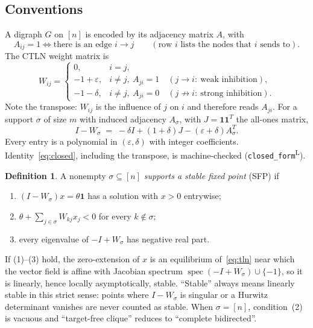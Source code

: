 \documentclass[11pt]{article}
\theoremstyle{definition}
\newtheorem{definition}[theorem]{Definition}
\newcommand{\one}{\mathbf{1}}
\newcommand{\eps}{\varepsilon}
\newcommand{\spec}{\operatorname{spec}}
\newcommand{\lean}{\textsuperscript{\textsf{L}}}
\begin{document}
\subsection{Conventions}
A digraph $G$ on $[n]$ is encoded by its adjacency matrix $A$, with
\[
A_{ij}=1\iff\text{there is an edge } i\to j\qquad(\text{row } i \text{ lists the nodes that } i \text{ sends to}).
\]
The CTLN weight matrix is
\begin{equation}\label{eq:W}
W_{ij}=\begin{cases}0,& i=j,\\ -1+\eps,& i\neq j,\ A_{ji}=1\quad(j\to i:\ \text{weak inhibition}),\\
-1-\delta,& i\neq j,\ A_{ji}=0\quad(j\not\to i:\ \text{strong inhibition}).\end{cases}
\end{equation}
Note the transpose: $W_{ij}$ is the influence of $j$ on $i$ and therefore reads $A_{ji}$. For a support
$\sigma$ of size $m$ with induced adjacency $A_\sigma$, with $J=\one\one^{T}$ the all-ones matrix,
\begin{equation}\label{eq:closed}
I-W_\sigma\;=\;-\delta I+(1+\delta)J-(\eps+\delta)A_\sigma^{T}.
\end{equation}
Every entry is a polynomial in $(\eps,\delta)$ with integer coefficients. Identity~\eqref{eq:closed},
including the transpose, is machine-checked (\texttt{closed\_form}\lean).

\begin{definition}\label{def:sfp}
A nonempty $\sigma\subseteq[n]$ \emph{supports a stable fixed point} (SFP) if
\begin{enumerate}
\item[(1)] $(I-W_\sigma)x=\theta\one$ has a solution with $x>0$ entrywise;
\item[(2)] $\theta+\sum_{j\in\sigma}W_{kj}x_j<0$ for every $k\notin\sigma$;
\item[(3)] every eigenvalue of $-I+W_\sigma$ has negative real part.
\end{enumerate}
\end{definition}
If (1)--(3) hold, the zero-extension of $x$ is an equilibrium of~\eqref{eq:tln} near which the vector field is
affine with Jacobian spectrum $\spec(-I+W_\sigma)\cup\{-1\}$, so it is linearly, hence locally
asymptotically, stable. ``Stable'' always means linearly stable in this strict sense: points where
$I-W_\sigma$ is singular or a Hurwitz determinant vanishes are never counted as stable. When
$\sigma=[n]$, condition~(2) is vacuous and ``target-free clique'' reduces to ``complete bidirected''.
\end{document}
